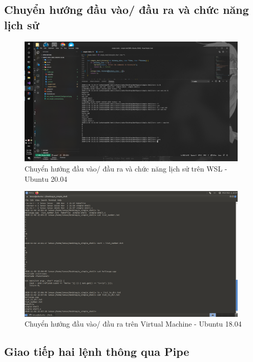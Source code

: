 \documentclass{article}
\begin{document}
\subsection{Chuyển hướng đầu vào/ đầu ra và chức năng lịch sử}

\begin{figure}[H]
\centering
\includegraphics[width=0.98\textwidth]{wsl_history_io_direct.png}
\caption{Chuyển hướng đầu vào/ đầu ra và chức năng lịch sử trên WSL - Ubuntu 20.04}
\end{figure}

\begin{figure}[H]
\centering
\includegraphics[width=0.98\textwidth]{virtual_machine_redirect_io.png}
\caption{Chuyển hướng đầu vào/ đầu ra trên Virtual Machine - Ubuntu 18.04}
\end{figure}

\subsection{Giao tiếp hai lệnh thông qua Pipe}
\end{document}
